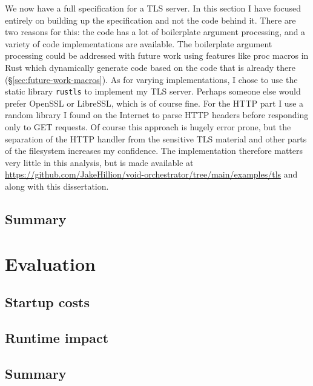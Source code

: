 \documentclass[12pt,a4paper,twoside]{report}
\begin{document}
We now have a full specification for a TLS server. In this section I have focused entirely on building up the specification and not the code behind it. There are two reasons for this: the code has a lot of boilerplate argument processing, and a variety of code implementations are available. The boilerplate argument processing could be addressed with future work using features like proc macros in Rust which dynamically generate code based on the code that is already there (§\ref{sec:future-work-macros}). As for varying implementations, I chose to use the static library \texttt{rustls} to implement my TLS server. Perhaps someone else would prefer OpenSSL or LibreSSL, which is of course fine. For the HTTP part I use a random library I found on the Internet to parse HTTP headers before responding only to GET requests. Of course this approach is hugely error prone, but the separation of the HTTP handler from the sensitive TLS material and other parts of the filesystem increases my confidence. The implementation therefore matters very little in this analysis, but is made available at \url{https://github.com/JakeHillion/void-orchestrator/tree/main/examples/tls} and along with this dissertation.

\section{Summary}



\chapter{Evaluation}
\label{chap:evaluation}


\section{Startup costs}
\label{sec:evaluation-startup}


\section{Runtime impact}
\label{sec:evaluation-applications}


\section{Summary}
\end{document}
